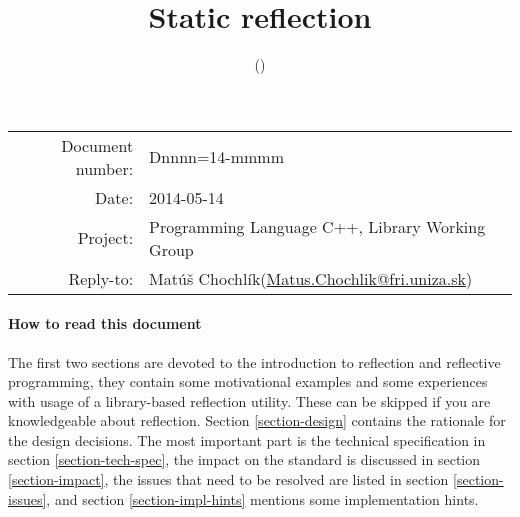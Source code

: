 \documentclass[11pt,a4paper,oneside]{scrartcl}
\title{Static reflection}
\author{\mchname (\mchmail)}
\makeatletter
\newcommand{\mchname}{Mat\'{u}\v{s} Chochl\'{i}k}
\newcommand{\mchmail}{Matus.Chochlik@fri.uniza.sk}
\newcommand{\docnum}{Dnnnn=14-mmmm}
\newcommand{\docdate}{2014-05-14}
\makeatother
\begin{document}
\begin{tabular}{r l}
Document number: & \docnum\\
Date: & \docdate\\
Project: & Programming Language C++, Library Working Group \\
Reply-to: & \mchname (\href{mailto:\mchmail}{\mchmail})\\
\end{tabular}

\paragraph{How to read this document}
The first two sections are devoted to the introduction to reflection and reflective
programming, they contain some motivational examples and some experiences
with usage of a library-based reflection utility. These can be skipped
if you are knowledgeable about reflection.
Section \ref{section-design} contains the rationale for the design decisions. 
The most important part is the technical specification in section \ref{section-tech-spec},
the impact on the standard is discussed in section \ref{section-impact},
the issues that need to be resolved are listed in section \ref{section-issues},
and section \ref{section-impl-hints} mentions some implementation hints.

\tableofcontents











\appendix

\end{document}
